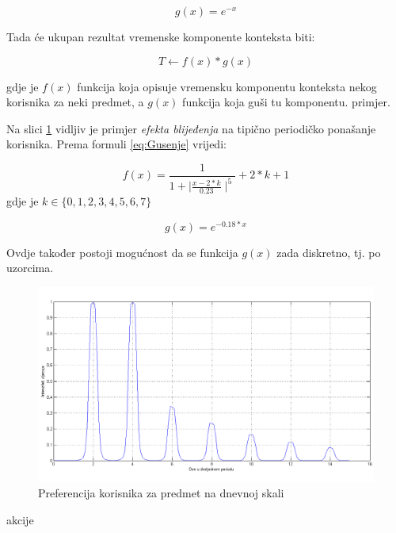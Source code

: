 \documentclass[times, utf8, diplomski, numeric]{fer}
\begin{document}
\begin{equation}
	\label{eq:RecipExp}
	g(x) = e^{-x}
\end{equation}

Tada će ukupan rezultat vremenske komponente konteksta biti:

\begin{equation}
	\label{eq:Gusenje}
	T \leftarrow f(x) \ast g(x)
\end{equation}

gdje je $f(x)$ funkcija koja opisuje vremensku komponentu konteksta nekog
korisnika za neki predmet, a $g(x)$ funkcija koja guši tu komponentu.
primjer. 

Na slici \ref{fig:GaussPriguseno} vidljiv je primjer \emph{efekta
blijeđenja} na tipično periodičko ponašanje korisnika. Prema formuli
\ref{eq:Gusenje} vrijedi:

\begin{equation}
	\label{eq:BellFunc}
	f(x) = \frac
	{
		1
	}
	{
		1 + \mid\frac{x - 2*k}{0.23}\mid^{5}
	}
	+ 2 \ast k + 1
\end{equation}
gdje je $k \in \{ 0, 1, 2, 3, 4, 5, 6, 7 \}$

\begin{equation}
	\label{eq:Prigusnica}
	g(x)=e^{-0.18 * x}
\end{equation}

Ovdje također postoji mogućnost da se funkcija $g(x)$ zada diskretno, tj. po
uzorcima.

\begin{figure}[htb]
	\centering
	\includegraphics[width=14.21cm]{images/prigusenocropped.png}
	\caption{Preferencija korisnika za predmet na dnevnoj skali}
	\label{fig:GaussPriguseno}
\end{figure}

akcije
\end{document}
